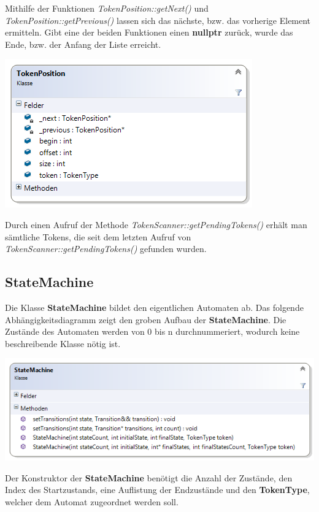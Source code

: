 \documentclass[
a4paper
]{scrreprt}
\begin{document}
	Mithilfe der Funktionen \textit{TokenPosition::getNext()} und \textit{TokenPosition::getPrevious()} lassen sich das nächste, bzw. das vorherige Element ermitteln. Gibt eine der beiden Funktionen einen \textbf{nullptr} zurück, wurde das Ende, bzw. der Anfang der Liste erreicht.
	\begin{center}		
		\includegraphics{./images/tokenposition_cd.png}
	\end{center}
	Durch einen Aufruf der Methode \textit{TokenScanner::getPendingTokens()} erhält man sämtliche Tokens, die seit dem letzten Aufruf von \textit{TokenScanner::getPendingTokens()} gefunden wurden.
	
	\subsection{StateMachine}
	Die Klasse \textbf{StateMachine} bildet den eigentlichen Automaten ab. Das folgende Abhängigkeitsdiagramm zeigt den groben Aufbau der \textbf{StateMachine}. Die Zustände des Automaten werden von 0 bis n durchnummeriert, wodurch keine beschreibende Klasse nötig ist.
	\begin{center}		
		\includegraphics[width=\linewidth]{./images/statemachine_cd.png}
	\end{center}
	Der Konstruktor der \textbf{StateMachine} benötigt die Anzahl der Zustände, den Index des Startzustands, eine Auflistung der Endzustände und den \textbf{TokenType}, welcher dem Automat zugeordnet werden soll.
	
\end{document}
